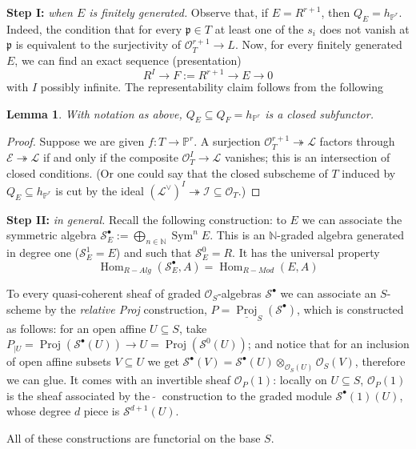 \documentclass[11pt,twoside]{report}
\newcommand{\PP}{\mathbb P}
\newcommand{\OO}{\mathcal O}
\renewcommand{\to}{\rightarrow}
\newcommand{\Proj}{\operatorname{Proj}}
\newcommand{\Hom}{\operatorname{Hom}}
\theoremstyle{plain}
\newtheorem{lem}[thm]{Lemma}
\theoremstyle{definition}
\begin{document}
\textbf {Step I:} \emph{when $E$ is finitely generated.} Observe that, if $E=R^{r+1}$, then $Q_E=h_{\PP^r}$. Indeed, the condition that for every $\mathfrak p\in T$ at least one of the $s_i$ does not vanish at $\mathfrak p$ is equivalent to the surjectivity of $\OO_T^{r+1}\to L$. Now, for every finitely generated $E$, we can find an exact sequence (presentation)
\[R^{I}\to F:=R^{r+1}\to E\to 0\]
with $I$ possibly infinite. The representability claim follows from the following
\begin{lem}
 With notation as above, $Q_E\subseteq Q_F=h_{\PP^r}$ is a closed subfunctor.
\end{lem}
\begin{proof}
 Suppose we are given $f\colon T\to \PP^r$. A surjection $\OO_T^{r+1}\twoheadrightarrow \mathcal L$ factors through $\mathcal E\twoheadrightarrow\mathcal L$ if and only if the composite $\OO_T^I\to \mathcal L$ vanishes; this is an intersection of closed conditions. (Or one could say that the closed subscheme of $T$ induced by $Q_E\subseteq h_{\PP^r}$ is cut by the ideal $(\mathcal L^\vee)^I\twoheadrightarrow \mathcal I\subseteq\OO_T$.)
\end{proof}

\textbf{Step II:} \emph{in general.} Recall the following construction: to $E$ we can associate the symmetric algebra $\mathcal S^\bullet_E:=\bigoplus_{n\in\mathbb N}\operatorname{Sym}^n E$. This is an $\mathbb N$-graded algebra generated in degree one  ($\mathcal S^1_E=E$) and such that $\mathcal S^0_E=R$. It has the universal property
\[ \Hom_{R-Alg}(\mathcal S^\bullet_E,A)=\Hom_{R-Mod}(E,A)\]

To every quasi-coherent sheaf of graded $\OO_S$-algebras $\mathcal S^\bullet$ we can associate an $S$-scheme by the \emph{relative Proj} construction, $P=\underline{\operatorname{Proj}}_S(\mathcal S^\bullet)$, which is constructed as follows: for an open affine $U\subseteq S$, take $P_{|U}=\Proj(\mathcal S^\bullet(U))\to U=\Proj(\mathcal S^0(U))$; and notice that for an inclusion of open affine subsets $V\subseteq U$ we get $\mathcal S^\bullet(V)=\mathcal S^\bullet(U)\otimes_{\OO_S(U)}\OO_S(V)$, therefore we can glue. It comes with an invertible sheaf $\OO_P(1)$: locally on $U\subseteq S$, $\OO_P(1)$ is the sheaf associated by the $\ \tilde{}\ $ construction to the graded module $\mathcal S^\bullet(1)(U)$, whose degree $d$ piece is $\mathcal S^{d+1}(U)$.

All of these constructions are functorial on the base $S$.
\end{document}
